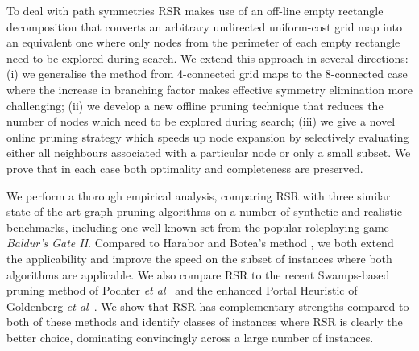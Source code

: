 To deal with path symmetries RSR makes use of an off-line
empty rectangle decomposition \cite{harabor10} that converts an arbitrary
undirected uniform-cost grid map into an equivalent one where only nodes
from the perimeter of each empty rectangle need to be explored during search.
We extend this approach in several directions: (i) we generalise the method
from 4-connected grid maps to the 8-connected case where the increase in
branching factor makes effective symmetry elimination more challenging; (ii) we
develop a new offline pruning technique that reduces the number of nodes which
need to be explored during search; (iii) we give a novel online pruning strategy
which speeds up node expansion by selectively evaluating either all neighbours
associated with a particular node or only a small subset.  We prove that in each
case both optimality and completeness are preserved.
\par
We perform a thorough empirical analysis, comparing RSR with three similar
state-of-the-art graph pruning algorithms on a
number of synthetic and realistic benchmarks, including one well known set from
the popular roleplaying game \emph{Baldur's Gate II}.  Compared to Harabor and
Botea's method \cite{harabor10}, we both extend the applicability and improve
the speed on the subset of instances where both algorithms are applicable.
We also compare RSR to the recent Swamps-based pruning method of Pochter \emph{et
al}~\cite{pochter10} and the enhanced Portal Heuristic of Goldenberg \emph{et
al}~\cite{goldenberg10}. 
We show that RSR has complementary strengths compared to both of these methods 
and identify classes of instances where RSR is clearly the better choice, 
dominating convincingly across a large number of instances.

